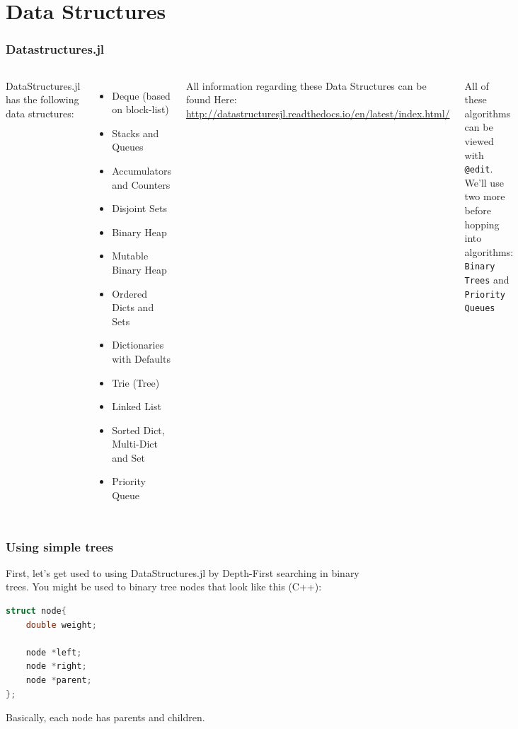 \documentclass{beamer}
\begin{document}
\section{Data Structures}

\begin{frame}
\frametitle{Datastructures.jl}

\begin{columns}
DataStructures.jl has the following data structures:
\begin{itemize}
\item Deque (based on block-list)
\item Stacks and Queues
\item Accumulators and Counters
\item Disjoint Sets
\item Binary Heap
\item Mutable Binary Heap
\item Ordered Dicts and Sets
\item Dictionaries with Defaults
\item Trie (Tree)
\item Linked List
\item Sorted Dict, Multi-Dict and Set
\item Priority Queue
\end{itemize}
\pause
{}
All information regarding these Data Structures can be found Here: \url{ http://datastructuresjl.readthedocs.io/en/latest/index.html/}

\vspace{0.5cm}
All of these algorithms can be viewed with \texttt{@edit}. We'll use two more before hopping into algorithms: \texttt{Binary Trees} and \texttt{Priority Queues}
\end{columns}

\end{frame}


\begin{frame}[fragile]
\frametitle{Using simple trees}
First, let's get used to using DataStructures.jl by Depth-First searching in binary trees. You might be used to binary 	tree nodes that look like this (C++):
\begin{lstlisting}[language=c++]
struct node{
    double weight;

    node *left;
    node *right;
    node *parent;
};
\end{lstlisting}

Basically, each node has parents and children.
\end{frame}
\end{document}
